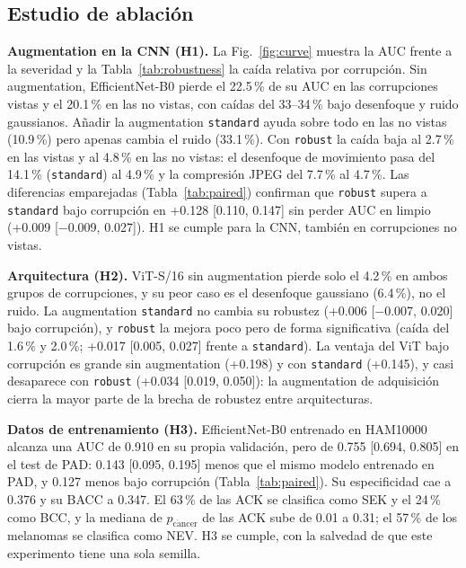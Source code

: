 \documentclass[conference]{IEEEtran}
\newcommand{\pc}{p_{\mathrm{c\acute{a}ncer}}}
\begin{document}
\subsection{Estudio de ablación}
\textbf{Augmentation en la CNN (H1).} La Fig.~\ref{fig:curve} muestra la AUC frente a la severidad y la Tabla~\ref{tab:robustness} la caída relativa por corrupción. Sin augmentation, EfficientNet-B0 pierde el 22.5\,\% de su AUC en las corrupciones vistas y el 20.1\,\% en las no vistas, con caídas del 33--34\,\% bajo desenfoque y ruido gaussianos. Añadir la augmentation \texttt{standard} ayuda sobre todo en las no vistas (10.9\,\%) pero apenas cambia el ruido (33.1\,\%). Con \texttt{robust} la caída baja al 2.7\,\% en las vistas y al 4.8\,\% en las no vistas: el desenfoque de movimiento pasa del 14.1\,\% (\texttt{standard}) al 4.9\,\% y la compresión JPEG del 7.7\,\% al 4.7\,\%. Las diferencias emparejadas (Tabla~\ref{tab:paired}) confirman que \texttt{robust} supera a \texttt{standard} bajo corrupción en +0.128 [0.110, 0.147] sin perder AUC en limpio (+0.009 [$-$0.009, 0.027]). H1 se cumple para la CNN, también en corrupciones no vistas.

\textbf{Arquitectura (H2).} ViT-S/16 sin augmentation pierde solo el 4.2\,\% en ambos grupos de corrupciones, y su peor caso es el desenfoque gaussiano (6.4\,\%), no el ruido. La augmentation \texttt{standard} no cambia su robustez (+0.006 [$-$0.007, 0.020] bajo corrupción), y \texttt{robust} la mejora poco pero de forma significativa (caída del 1.6\,\% y 2.0\,\%; +0.017 [0.005, 0.027] frente a \texttt{standard}). La ventaja del ViT bajo corrupción es grande sin augmentation (+0.198) y con \texttt{standard} (+0.145), y casi desaparece con \texttt{robust} (+0.034 [0.019, 0.050]): la augmentation de adquisición cierra la mayor parte de la brecha de robustez entre arquitecturas.

\textbf{Datos de entrenamiento (H3).} EfficientNet-B0 entrenado en HAM10000 alcanza una AUC de 0.910 en su propia validación, pero de 0.755 [0.694, 0.805] en el test de PAD: 0.143 [0.095, 0.195] menos que el mismo modelo entrenado en PAD, y 0.127 menos bajo corrupción (Tabla~\ref{tab:paired}). Su especificidad cae a 0.376 y su BACC a 0.347. El 63\,\% de las ACK se clasifica como SEK y el 24\,\% como BCC, y la mediana de $\pc$ de las ACK sube de 0.01 a 0.31; el 57\,\% de los melanomas se clasifica como NEV. H3 se cumple, con la salvedad de que este experimento tiene una sola semilla.
\end{document}
